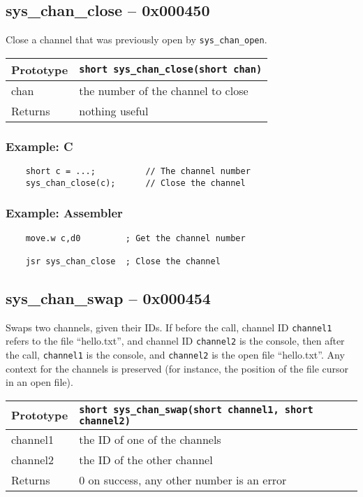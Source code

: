 \subsection*{sys\_chan\_close -- 0x000450}
Close a channel that was previously open by \lstinline|sys_chan_open|.

\bigskip

\begin{tabular}{|l||l|} \hline
Prototype & \lstinline!short sys_chan_close(short chan)! \\ \hline
chan & the number of the channel to close \\ \hline
Returns & nothing useful \\ \hline
\end{tabular}

\subsubsection*{Example: C}
\begin{lstlisting}
    short c = ...;          // The channel number
    sys_chan_close(c);      // Close the channel
\end{lstlisting}

\subsubsection*{Example: Assembler}
\begin{verbatim}
    move.w c,d0         ; Get the channel number
	
    jsr sys_chan_close  ; Close the channel
\end{verbatim}

\subsection*{sys\_chan\_swap -- 0x000454}
Swaps two channels, given their IDs. If before the call, channel ID \verb+channel1+ refers to the file ``hello.txt'',
and channel ID \verb+channel2+ is the console, then after the call, \verb+channel1+ is the console, and \verb+channel2+ is
the open file ``hello.txt''. Any context for the channels is preserved (for instance, the position of the file cursor in an open file).

\bigskip

\begin{tabular}{|l||l|} \hline
Prototype & \lstinline!short sys_chan_swap(short channel1, short channel2)! \\ \hline
channel1 & the ID of one of the channels \\ \hline
channel2 & the ID of the other channel \\ \hline
Returns & 0 on success, any other number is an error \\ \hline
\end{tabular}

